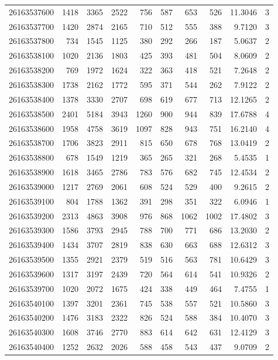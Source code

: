 \documentclass[
  11pt,
]{article}
\begin{document}
\begin{longtable}[t]{lrrrrrrrrr}
26163537600 & 1418 & 3365 & 2522 & 756 & 587 & 653 & 526 & 11.3046 & 3\\
26163537700 & 1420 & 2874 & 2165 & 710 & 512 & 555 & 388 & 9.7120 & 3\\
26163537800 & 734 & 1545 & 1125 & 380 & 292 & 266 & 187 & 5.0637 & 2\\
26163538100 & 1020 & 2136 & 1803 & 425 & 393 & 481 & 504 & 8.0609 & 2\\
26163538200 & 769 & 1972 & 1624 & 322 & 363 & 418 & 521 & 7.2648 & 2\\
26163538300 & 1738 & 2162 & 1772 & 595 & 371 & 544 & 262 & 7.9122 & 2\\
26163538400 & 1378 & 3330 & 2707 & 698 & 619 & 677 & 713 & 12.1265 & 2\\
26163538500 & 2401 & 5184 & 3943 & 1260 & 900 & 944 & 839 & 17.6788 & 4\\
26163538600 & 1958 & 4758 & 3619 & 1097 & 828 & 943 & 751 & 16.2140 & 4\\
26163538700 & 1706 & 3823 & 2911 & 815 & 650 & 678 & 768 & 13.0419 & 2\\
26163538800 & 678 & 1549 & 1219 & 365 & 265 & 321 & 268 & 5.4535 & 1\\
26163538900 & 1618 & 3465 & 2786 & 783 & 576 & 682 & 745 & 12.4534 & 2\\
26163539000 & 1217 & 2769 & 2061 & 608 & 524 & 529 & 400 & 9.2615 & 2\\
26163539100 & 804 & 1788 & 1362 & 391 & 298 & 351 & 322 & 6.0946 & 1\\
26163539200 & 2313 & 4863 & 3908 & 976 & 868 & 1062 & 1002 & 17.4802 & 3\\
26163539300 & 1586 & 3793 & 2945 & 788 & 700 & 771 & 686 & 13.2030 & 2\\
26163539400 & 1434 & 3707 & 2819 & 838 & 630 & 663 & 688 & 12.6312 & 3\\
26163539500 & 1355 & 2921 & 2379 & 519 & 516 & 563 & 781 & 10.6429 & 3\\
26163539600 & 1317 & 3197 & 2439 & 720 & 564 & 614 & 541 & 10.9326 & 2\\
26163539700 & 1020 & 2072 & 1675 & 424 & 338 & 449 & 464 & 7.4755 & 1\\
26163540100 & 1397 & 3201 & 2361 & 745 & 538 & 557 & 521 & 10.5860 & 3\\
26163540200 & 1476 & 3183 & 2322 & 826 & 524 & 588 & 384 & 10.4070 & 3\\
26163540300 & 1608 & 3746 & 2770 & 883 & 614 & 642 & 631 & 12.4129 & 3\\
26163540400 & 1252 & 2632 & 2026 & 588 & 458 & 543 & 437 & 9.0709 & 2\\

\end{longtable}
\end{document}
